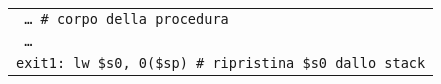 \documentclass[../main.tex]{subfiles}
\begin{document}
\begin{tabular}{ l }
    \hline
    \hline
    \texttt{\hspace*{0cm} \hspace*{0cm} \hspace*{0cm} \hspace*{0cm} \hspace*{0cm} \hspace*{0cm} \hspace*{0cm} \hspace*{0cm} \hspace*{0cm} \dots \hspace*{0cm} \hspace*{0cm} \hspace*{0cm} \hspace*{0cm} \hspace*{0cm} \hspace*{0cm} \hspace*{0cm} \hspace*{0cm} \hspace*{0cm} \hspace*{0cm} \hspace*{0cm} \hspace*{0cm} \hspace*{0cm} \hspace*{0cm} \hspace*{0cm} \hspace*{0cm} \hspace*{0cm} \hspace*{0cm} \hspace*{0cm} \hspace*{0cm} \# corpo della procedura} \\
    \texttt{\hspace*{0cm} \hspace*{0cm} \hspace*{0cm} \hspace*{0cm} \hspace*{0cm} \hspace*{0cm} \hspace*{0cm} \hspace*{0cm} \hspace*{0cm} \dots} \\
    \hline
    \hline
    \texttt{exit1:\hspace*{0cm} \hspace*{0cm} \hspace*{0cm} lw \$s0, 0(\$sp) \hspace*{0cm} \hspace*{0cm} \hspace*{0cm} \hspace*{0cm} \hspace*{0cm} \hspace*{0cm} \hspace*{0cm} \hspace*{0cm} \# ripristina \$s0 dallo stack} \\

\end{tabular}
\end{document}
